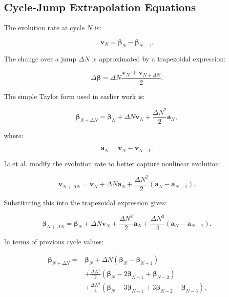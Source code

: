 \documentclass[11pt,a4paper]{article}
\begin{document}
\subsection{Cycle-Jump Extrapolation Equations}

The evolution rate at cycle $N$ is:

\begin{equation}
\bm{v}_N
=
\bm{\beta}_N
-
\bm{\beta}_{N-1}.
\end{equation}

The change over a jump $\Delta N$ is approximated by a trapezoidal expression:

\begin{equation}
\Delta \bm{\beta}
=
\Delta N
\frac{
\bm{v}_N+\bm{v}_{N+\Delta N}
}{2}.
\end{equation}

The simple Taylor form used in earlier work is:

\begin{equation}
\bm{\beta}_{N+\Delta N}
=
\bm{\beta}_N
+
\Delta N\bm{v}_N
+
\frac{\Delta N^2}{2}\bm{a}_N ,
\end{equation}

where:

\begin{equation}
\bm{a}_N
=
\bm{v}_N-\bm{v}_{N-1}.
\end{equation}

Li et al. modify the evolution rate to better capture nonlinear evolution:

\begin{equation}
\bm{v}_{N+\Delta N}
=
\bm{v}_N
+
\Delta N\bm{a}_N
+
\frac{\Delta N^2}{2}
(\bm{a}_N-\bm{a}_{N-1}) .
\end{equation}

Substituting this into the trapezoidal expression gives:

\begin{equation}
\bm{\beta}_{N+\Delta N}
=
\bm{\beta}_N
+
\Delta N\bm{v}_N
+
\frac{\Delta N^2}{2}\bm{a}_N
+
\frac{\Delta N^3}{4}
(\bm{a}_N-\bm{a}_{N-1}) .
\end{equation}

In terms of previous cycle values:

\begin{equation}
\begin{aligned}
\bm{\beta}_{N+\Delta N}
=
&\bm{\beta}_N
+
\Delta N(\bm{\beta}_N-\bm{\beta}_{N-1}) \\
&+
\frac{\Delta N^2}{2}
(\bm{\beta}_N-2\bm{\beta}_{N-1}+\bm{\beta}_{N-2}) \\
&+
\frac{\Delta N^3}{4}
(\bm{\beta}_N-3\bm{\beta}_{N-1}+3\bm{\beta}_{N-2}-\bm{\beta}_{N-3}) .
\end{aligned}
\end{equation}
\end{document}
